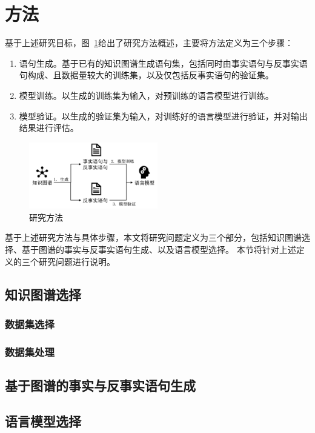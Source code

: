 \section{方法}
基于上述研究目标，图~\ref{fig:研究方法}给出了研究方法概述，主要将方法定义为三个步骤：

\begin{enumerate}
    \item 语句生成。基于已有的知识图谱生成语句集，包括同时由事实语句与反事实语句构成、且数据量较大的训练集，以及仅包括反事实语句的验证集。
    \item 模型训练。以生成的训练集为输入，对预训练的语言模型进行训练。
    \item 模型验证。以生成的验证集为输入，对训练好的语言模型进行验证，并对输出结果进行评估。
\end{enumerate}

\begin{figure}[htb]
    \centering
    \includegraphics[width=0.5\textwidth]{images/研究方法.png}
    \caption[研究方法]{研究方法}
    \label{fig:研究方法}
\end{figure}

基于上述研究方法与具体步骤，本文将研究问题定义为三个部分，包括知识图谱选择、基于图谱的事实与反事实语句生成、以及语言模型选择。
本节将针对上述定义的三个研究问题进行说明。

\subsection{知识图谱选择}
\subsubsection{数据集选择}
\subsubsection{数据集处理}


\subsection{基于图谱的事实与反事实语句生成}


\subsection{语言模型选择}

